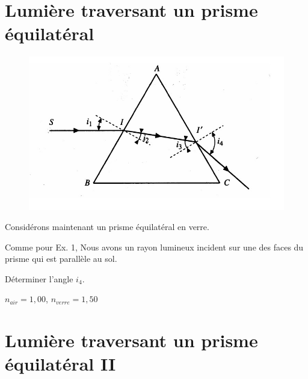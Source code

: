 \documentclass[11pt,a4paper]{article}
\begin{document}
\endgroup

\section{Lumière traversant un prisme équilatéral}

\begingroup
\setlength{\intextsep}{0pt}%
\setlength{\columnsep}{0pt}%
\begin{figure}
    \centering
    \includegraphics[width=.95\linewidth]{refraction/prisme2.jpg}
\end{figure}

Considérons maintenant un prisme équilatéral en verre. 

Comme pour Ex. 1, Nous avons un rayon lumineux incident sur une des faces du prisme qui est parallèle au sol. 

Déterminer l'angle $i_4$. 

\endgroup
\vspace{1cm}
\begin{tcolorbox}[title=Données]
$n_{air}=1,00$, $n_{verre}=1,50$  
\end{tcolorbox}

\section{Lumière traversant un prisme équilatéral II}
\begingroup
\setlength{\intextsep}{0pt}%
\setlength{\columnsep}{0pt}%
\begin{figure}
    \centering

\end{figure}
\end{document}
